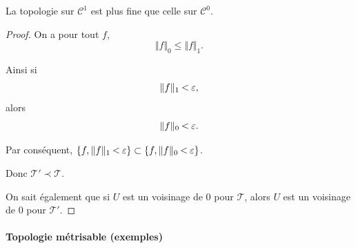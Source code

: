 \documentclass[french]{book}
\theoremstyle{definition}
\theoremstyle{remark}
\newcommand{\lesss}{\rotatebox[origin=c]{90}{$\land$}}
\newcommand{\less}{\ \lesss\ }
\begin{document}
La topologie sur $\mathcal{C}^1$ est plus fine que celle sur $\mathcal{C}^0$.

\begin{proof}
  On a pour tout $f$, $$\Vert f \Vert _{0} \leq \Vert f \Vert _{1} .$$

  Ainsi si $$\Vert f \Vert _{1} \less \varepsilon,   $$ alors $$\Vert f \Vert _{0} \less \varepsilon.  $$

  Par conséquent, $\{ f , \Vert f \Vert _{1 } \less \varepsilon  \} \subset \{ f, \Vert f \Vert _{0} \less \varepsilon   \} $.

  Donc $\mathscr{T}' \prec \mathscr{T}  $.

  On sait également que si $U$ est un voisinage de 0 pour $\mathscr{T} $, alors $U$ est un voisinage de 0 pour $\mathscr{T}' $.
\end{proof}

\paragraph{Topologie métrisable (exemples)}
\end{document}
